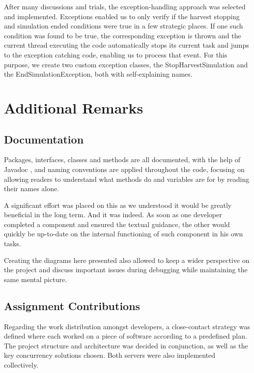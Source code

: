 \documentclass[12pt]{article}
\begin{document}
After many discussions and trials, the exception-handling approach was selected and implemented. 
Exceptions enabled us to only verify if the harvest stopping and simulation ended conditions were true in a few strategic places.
If one such condition was found to be true, the corresponding exception is thrown and the current thread executing the code automatically stops its current task 
and jumps to the exception catching code, enabling us to process that event. 
For this purpose, we create two custom exception classes, the StopHarvestSimulation and the EndSimulationException, both with self-explaining names.

\newpage
\section{Additional Remarks} %

\subsection{Documentation} %

Packages, interfaces, classes and methods are all documented, with the help of Javadoc \cite{javadoc}, and naming conventions are applied throughout the code, 
focusing on allowing readers to understand what methods do and variables are for by reading their names alone.

A significant effort was placed on this as we understood it would be greatly beneficial in the long term.
And it was indeed. As soon as one developer completed a component and ensured the textual guidance, the other would quickly be up-to-date on the internal 
functioning of such component in his own tasks.

Creating the diagrams here presented also allowed to keep a wider perspective on the project and discuss important issues during debugging while maintaining 
the same mental picture.

\subsection{Assignment Contributions} %

Regarding the work distribution amongst developers, a close-contact strategy was defined where each worked on a piece of software according to a predefined plan. 
The project structure and architecture was decided in conjunction, as well as the key concurrency solutions chosen.
Both servers were also implemented collectively.
\end{document}
